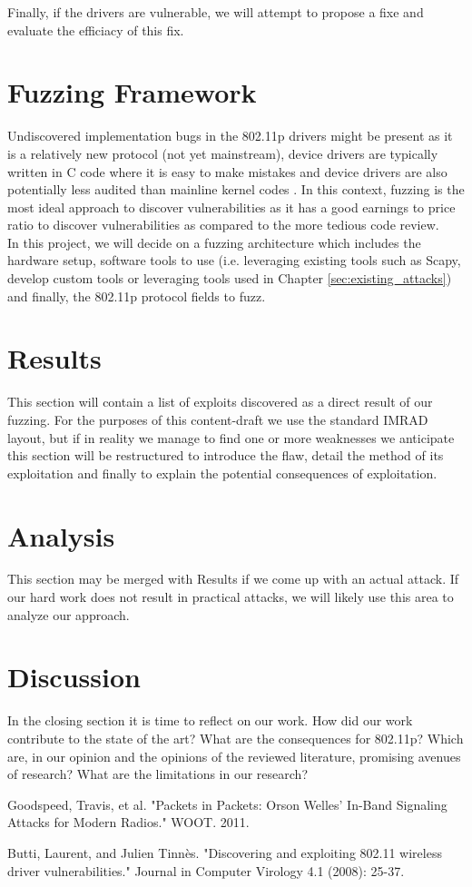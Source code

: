 \documentclass[conference]{IEEEtran}
\begin{document}
Finally, if the drivers are vulnerable, we will attempt to propose a fixe and evaluate the efficiacy of this fix.

\section{Fuzzing Framework}
Undiscovered implementation bugs in the 802.11p drivers might be present as it is a relatively new protocol (not yet mainstream), device drivers are typically written in C code where it is easy to make mistakes and device drivers are also potentially less audited than mainline kernel codes \cite{butti08}.  In this context, fuzzing is the most ideal approach to discover vulnerabilities as it has a good earnings to price ratio to discover vulnerabilities as compared to the more tedious code review.\\

In this project, we will decide on a fuzzing architecture which includes the hardware setup, software tools to use (i.e. leveraging existing tools such as Scapy, develop custom tools or leveraging tools used in Chapter \ref{sec:existing_attacks}) and finally, the 802.11p protocol fields to fuzz.

\section{Results}
This section will contain a list of exploits discovered as a direct result of our fuzzing. For the purposes of this content-draft we use the standard IMRAD layout, but if in reality we manage to find one or more weaknesses we anticipate this section will be restructured to introduce the flaw, detail the method of its exploitation and finally to explain the potential consequences of exploitation.

\section{Analysis}
This section may be merged with Results if we come up with an actual attack. If our hard work does not result in practical attacks, we will likely use this area to analyze our approach.

\section{Discussion}
In the closing section it is time to reflect on our work. How did our work contribute to the state of the art? What are the consequences for 802.11p? Which are, in our opinion and the opinions of the reviewed literature, promising avenues of research? What are the limitations in our research?

\begin{thebibliography}{99}
Goodspeed, Travis, et al. "Packets in Packets: Orson Welles' In-Band Signaling Attacks for Modern Radios." WOOT. 2011.

Butti, Laurent, and Julien Tinnès. "Discovering and exploiting 802.11 wireless driver vulnerabilities." Journal in Computer Virology 4.1 (2008): 25-37.

\end{thebibliography}
\end{document}
